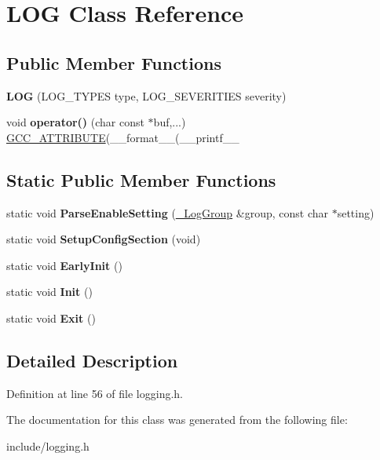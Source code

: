 \hypertarget{classLOG}{\section{L\-O\-G Class Reference}
\label{classLOG}
}
\subsection*{Public Member Functions}
\begin{DoxyCompactItemize}
\item 
\hypertarget{classLOG_a9e4ca0c6852f35edaa02ea890affc566}{{\bfseries L\-O\-G} (L\-O\-G\-\_\-\-T\-Y\-P\-E\-S type, L\-O\-G\-\_\-\-S\-E\-V\-E\-R\-I\-T\-I\-E\-S severity)}\label{classLOG_a9e4ca0c6852f35edaa02ea890affc566}

\item 
\hypertarget{classLOG_a2511c7332dcc271afa2a6422fc0516dd}{void {\bfseries operator()} (char const $\ast$buf,...) \hyperlink{structGCC__ATTRIBUTE}{G\-C\-C\-\_\-\-A\-T\-T\-R\-I\-B\-U\-T\-E}(\-\_\-\-\_\-format\-\_\-\-\_\-(\-\_\-\-\_\-printf\-\_\-\-\_\-}\label{classLOG_a2511c7332dcc271afa2a6422fc0516dd}

\end{DoxyCompactItemize}
\subsection*{Static Public Member Functions}
\begin{DoxyCompactItemize}
\item 
\hypertarget{classLOG_a566d29e9080e6b138e916d6a1ad8ec95}{static void {\bfseries Parse\-Enable\-Setting} (\hyperlink{struct__LogGroup}{\-\_\-\-Log\-Group} \&group, const char $\ast$setting)}\label{classLOG_a566d29e9080e6b138e916d6a1ad8ec95}

\item 
\hypertarget{classLOG_aa5ad86c5fb8b6e21f5646b5ec1998080}{static void {\bfseries Setup\-Config\-Section} (void)}\label{classLOG_aa5ad86c5fb8b6e21f5646b5ec1998080}

\item 
\hypertarget{classLOG_a05ad2a2c58fd5a7e5c76deadb89b029d}{static void {\bfseries Early\-Init} ()}\label{classLOG_a05ad2a2c58fd5a7e5c76deadb89b029d}

\item 
\hypertarget{classLOG_ac2b3dc20937e4ae0c00cf44e3ae561d8}{static void {\bfseries Init} ()}\label{classLOG_ac2b3dc20937e4ae0c00cf44e3ae561d8}

\item 
\hypertarget{classLOG_a672586a913f35bd12ff0650391c75b8e}{static void {\bfseries Exit} ()}\label{classLOG_a672586a913f35bd12ff0650391c75b8e}

\end{DoxyCompactItemize}


\subsection{Detailed Description}


Definition at line 56 of file logging.\-h.



The documentation for this class was generated from the following file\-:\begin{DoxyCompactItemize}
\item 
include/logging.\-h\end{DoxyCompactItemize}
